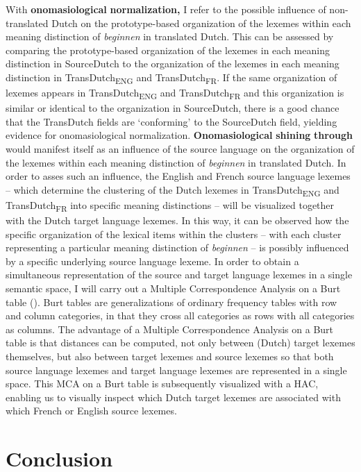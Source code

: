 With \textbf{onomasiological} \textbf{normalization,} I refer to the possible influence of non-translated Dutch on the prototype-based organization of the lexemes within each meaning distinction of \textit{beginnen} in translated Dutch. This can be assessed by comparing the prototype-based organization of the lexemes in each meaning distinction in SourceDutch to the organization of the lexemes in each meaning distinction in TransDutch\textsubscript{ENG} and TransDutch\textsubscript{FR}. If the same organization of lexemes appears in TransDutch\textsubscript{ENG} and TransDutch\textsubscript{FR} and this organization is similar or identical to the organization in SourceDutch, there is a good chance that the TransDutch fields are ‘conforming’ to the SourceDutch field, yielding evidence for onomasiological normalization. \textbf{Onomasiological} \textbf{shining} \textbf{through} would manifest itself as an influence of the source language on the organization of the lexemes within each meaning distinction of \textit{beginnen} in translated Dutch. In order to asses such an influence, the English and French source language lexemes – which determine the clustering of the Dutch lexemes in TransDutch\textsubscript{ENG} and TransDutch\textsubscript{FR} into specific meaning distinctions – will be visualized together with the Dutch target language lexemes. In this way, it can be observed how the specific organization of the lexical items within the clusters – with each cluster representing a particular meaning distinction of \textit{beginnen} – is possibly influenced by a specific underlying source language lexeme. In order to obtain a simultaneous representation of the source and target language lexemes in a single semantic space, I will carry out a Multiple Correspondence Analysis on a Burt table (\citealt{greenacre_simple_2006, greenacre_correspondence_2007}). Burt tables are generalizations of ordinary frequency tables with row and column categories, in that they cross all categories as rows with all categories as columns. The advantage of a Multiple Correspondence Analysis on a Burt table is that distances can be computed, not only between (Dutch) target lexemes themselves, but also between target lexemes and source lexemes so that both source language lexemes and target language lexemes are represented in a single space. This MCA on a Burt table is subsequently visualized with a HAC, enabling us to visually inspect which Dutch target lexemes are associated with which French or English source lexemes.


\section{\label{sec:3.9}  Conclusion}

